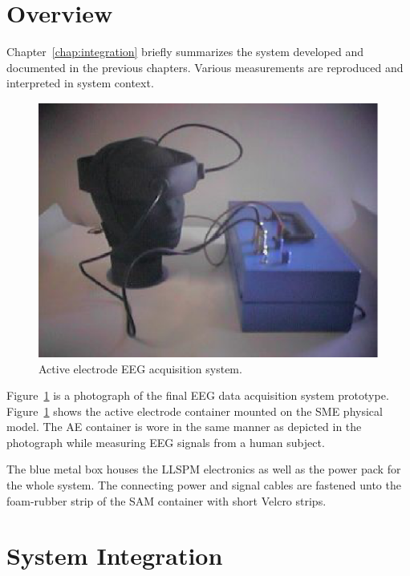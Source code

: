 \section{Overview}

Chapter~\ref{chap:integration} briefly summarizes the system developed
and documented in the previous chapters. Various measurements are
reproduced and interpreted in system context.

\begin{figure}[htbp]
\begin{center}
	\includegraphics*{whole-system2.ps}
	\caption{Active electrode EEG acquisition system.}
\label{fig:eeg-fin}
\end{center}
\end{figure}

Figure~\ref{fig:eeg-fin} is a photograph of the final EEG data
acquisition system prototype. Figure~\ref{fig:eeg-fin} shows the
active electrode container mounted on the SME physical model. The AE
container is wore in the same manner as depicted in the photograph
while measuring EEG signals from a human subject.

The blue metal box houses the LLSPM electronics as well as the power
pack for the whole system. The connecting power and signal cables are
fastened unto the foam-rubber strip of the SAM container with short
Velcro strips. 


\section{System Integration}

